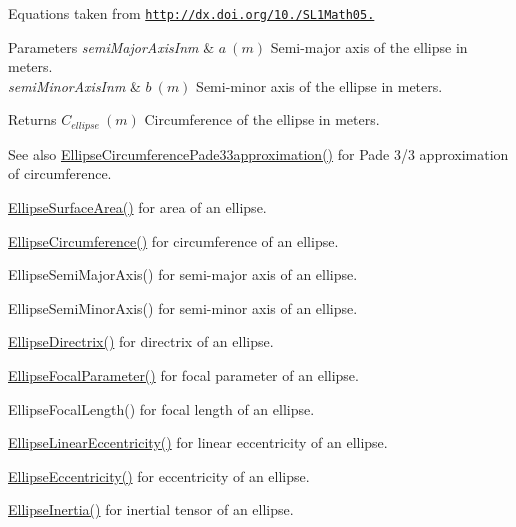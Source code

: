Equations taken from \href{http://dx.doi.org/10.3247/SL1Math05.004}{\tt http\+://dx.\+doi.\+org/10./\+S\+L1\+Math05.} 
\begin{DoxyParams}{Parameters}
{\em semi\+Major\+Axis\+Inm} & $ a\ (m)$ Semi-\/major axis of the ellipse in meters. \\
\hline
{\em semi\+Minor\+Axis\+Inm} & $ b\ (m)$ Semi-\/minor axis of the ellipse in meters. \\
\hline
\end{DoxyParams}
\begin{DoxyReturn}{Returns}
$ C_{ellipse}\ (m)$ Circumference of the ellipse in meters. 
\end{DoxyReturn}
\begin{DoxySeeAlso}{See also}
\mbox{\hyperlink{group___e_g_x_math-_geometry-2_d-_ellipse-_circumference_ga0e0b290f1da2605c16ec13b9e221769d}{Ellipse\+Circumference\+Pade33approximation()}} for Pade 3/3 approximation of circumference. 

\mbox{\hyperlink{group___e_g_x_math-_geometry-2_d-_ellipse-_surface_area_ga4ce8c8323e9718ce5458f4ab7f6d823d}{Ellipse\+Surface\+Area()}} for area of an ellipse. 

\mbox{\hyperlink{group___e_g_x_math-_geometry-2_d-_ellipse-_circumference_ga4172802ac674eb53467b44928ac635c7}{Ellipse\+Circumference()}} for circumference of an ellipse. 

Ellipse\+Semi\+Major\+Axis() for semi-\/major axis of an ellipse. 

Ellipse\+Semi\+Minor\+Axis() for semi-\/minor axis of an ellipse. 

\mbox{\hyperlink{group___e_g_x_math-_geometry-2_d-_ellipse-_directrix_gace8f72a8efbc9c18d3eb689151405106}{Ellipse\+Directrix()}} for directrix of an ellipse. 

\mbox{\hyperlink{group___e_g_x_math-_geometry-2_d-_ellipse-_focal_parameter_ga4cd01a38c72c092ef9791351948bf69b}{Ellipse\+Focal\+Parameter()}} for focal parameter of an ellipse. 

Ellipse\+Focal\+Length() for focal length of an ellipse. 

\mbox{\hyperlink{group___e_g_x_math-_geometry-2_d-_ellipse-_linear_eccentricity_gac70b3010e30aa8b73deb50fe2b9b9a91}{Ellipse\+Linear\+Eccentricity()}} for linear eccentricity of an ellipse. 

\mbox{\hyperlink{group___e_g_x_math-_geometry-2_d-_ellipse-_eccentricity_ga6a0a7fba17f782616894cfc447628c33}{Ellipse\+Eccentricity()}} for eccentricity of an ellipse. 

\mbox{\hyperlink{group___e_g_x_math-_geometry-2_d-_ellipse-_inertia_ga10a3049c2f04b50f271fb01dc62e4cf8}{Ellipse\+Inertia()}} for inertial tensor of an ellipse. 
\end{DoxySeeAlso}
\mbox{\label{group___e_g_x_math-_geometry-2_d-_ellipse-_circumference_ga2d4ee70e08d6fb4b56209ad4fc3f38ca}} 
